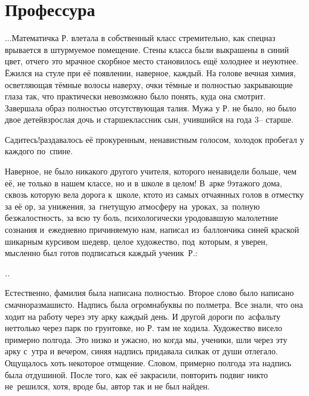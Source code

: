 \newpage
\section*{Профессура}

$\ldots$Математичка Р. влетала в собственный класс стремительно, как спецназ врывается в штурмуемое помещение. Стены класса были выкрашены в синий цвет, отчего это мрачное скорбное место становилось ещё холоднее и неуютнее. Ёжился на стуле при её появлении, наверное, каждый. На голове вечная химия, осветляющая тёмные волосы наверху, очки тёмные и полностью закрывающие глаза так, что практически невозможно было понять, куда она смотрит. Завершала образ полностью отсутствующая талия. Мужа у Р. не было, но было двое детей\mdash взрослая дочь и старшеклассник сын, учившийся на года 3\thinspace\nobreakdash-- старше.

\diagdash Садитесь!\mdash раздавалось её прокуренным, ненавистным голосом, холодок пробегал у каждого по~спине. 

Наверное, не было никакого другого учителя, которого ненавидели больше, чем её, не только в нашем классе, но и в школе в целом! В~арке 9\sdash этажого дома, сквозь которую вела дорога к~школе, кто\sdash то из самых отчаянных голов в отместку за её ор, за унижения, за~гнетущую атмосферу на~уроках, за~полную безжалостность, за всю ту боль, психологически уродовавшую малолетние сознания и~ежедневно причиняемую нам, написал из~баллончика синей краской шикарным курсивом шедевр, целое художество, под~которым, я уверен, мысленно был готов подписаться каждый ученик~Р.:
\begin{center}
\LARGE\textit{{.}\mdash {}.} 
\end{center}

Естественно, фамилия была написана полностью. Второе слово было написано смачно\sdash размашисто. Надпись была огромна\mdash буквы по полметра. Все знали, что она ходит на работу через эту арку каждый день. И другой дороги по~асфальту нет\mdash только через парк по грунтовке, но Р. там не ходила. Художество висело примерно полгода. Это низко и ужасно, но когда мы, ученики, шли через эту арку с~утра и вечером, синяя надпись придавала сил\mdash как от души отлегало. Ощущалось хоть некоторое отмщение. Словом, примерно полгода эта надпись была отдушиной. После того, как её закрасили, повторить подвиг никто не~решился, хотя, вроде бы, автор так и не был найден.

